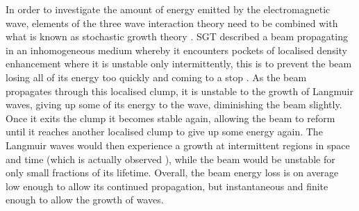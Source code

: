 %
%

In order to investigate the amount of energy emitted by the electromagnetic wave, elements of the three wave interaction theory need to be combined with what is known as stochastic growth theory \citep[SGT;][]{robinson1993a}. 
SGT described a beam propagating in an inhomogeneous medium whereby it encounters pockets of localised density enhancement where it is unstable only intermittently, this is to prevent the beam losing all of its energy too quickly and coming to a stop \citep{sturrock1964, ginzburg1958}. As the beam propagates through this localised clump, it is unstable to the growth of Langmuir waves, giving up some of its energy to the wave, diminishing the beam slightly. Once it exits the clump it becomes stable again, allowing the beam to reform until it reaches another localised clump to give up some energy again. The Langmuir waves would then experience a growth at intermittent regions in space and time (which is actually observed \citep{lin1986}), while the beam would be unstable for only small fractions of its lifetime. Overall, the beam energy loss is on average low enough to allow its continued propagation, but instantaneous and finite enough to allow the growth of waves. 
